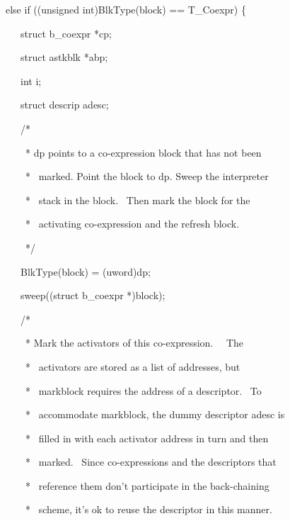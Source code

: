 \bigskip

{\ttfamily\mdseries
\ \ \ else if ((unsigned int)BlkType(block) == T\_Coexpr) \{
}

{\ttfamily\mdseries
\ \ \ \ \ \ struct b\_coexpr *cp;
}

{\ttfamily\mdseries
\ \ \ \ \ \ struct astkblk *abp;
}

{\ttfamily\mdseries
\ \ \ \ \ \ int i;
}

{\ttfamily\mdseries
\ \ \ \ \ \ struct descrip adesc;
}


\bigskip

{\ttfamily\mdseries
\ \ \ \ \ \ /*
}

{\ttfamily\mdseries
\ \ \ \ \ \ \ * dp points to a co-expression block that has not been
}

{\ttfamily\mdseries
\ \ \ \ \ \ \ * \ marked. Point the block to dp. Sweep the interpreter
}

{\ttfamily\mdseries
\ \ \ \ \ \ \ * \ stack in the block. \ Then mark the block for the
}

{\ttfamily\mdseries
\ \ \ \ \ \ \ * \ activating co-expression and the refresh block.
}

{\ttfamily\mdseries
\ \ \ \ \ \ \ */
}

{\ttfamily\mdseries
\ \ \ \ \ \ BlkType(block) = (uword)dp;
}

{\ttfamily\mdseries
\ \ \ \ \ \ sweep((struct b\_coexpr *)block);
}


\bigskip

{\ttfamily\mdseries
\ \ \ \ \ \ /*
}

{\ttfamily\mdseries
\ \ \ \ \ \ \ * Mark the activators of this co-expression. \ \ The
}

{\ttfamily\mdseries
\ \ \ \ \ \ \ * \ activators are stored as a list of addresses, but}

{\ttfamily\mdseries
\ \ \ \ \ \ \ * \ markblock requires the address of a descriptor. \ To}

{\ttfamily\mdseries
\ \ \ \ \ \ \ * \ accommodate markblock, the dummy descriptor adesc is}

{\ttfamily\mdseries
\ \ \ \ \ \ \ * \ filled in with each activator address in turn and then}

{\ttfamily\mdseries
\ \ \ \ \ \ \ * \ marked. \ Since co-expressions and the descriptors that}

{\ttfamily\mdseries
\ \ \ \ \ \ \ * \ reference them don't participate in the back-chaining}

{\ttfamily\mdseries
\ \ \ \ \ \ \ * \ scheme, it's ok to reuse the descriptor in this manner.
}

